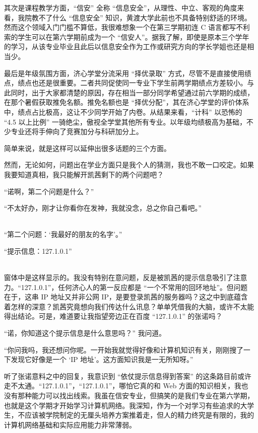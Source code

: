 \documentclass[UTF8]{ctexart}
\begin{document}
其次是课程教学方面，“信安” 全称 “信息安全”，从理性、中立、客观的角度来看，我院教不了什么 “信息安全” 知识，黄渡大学此前也不具备特别舒适的环境。然而这个领域入门门槛不算低，我很难想象一个在第三学期初连 C 语言都写不利索的学生可以在第六学期前成为一个 “信安人”。据我了解，即使是原本三个学年的学习，从该专业毕业且此后以信息安全作为工作或研究方向的学长学姐也还是相当少。

最后是年级氛围方面，济心学堂分流采用 “择优录取” 方式，尽管不是直接使用绩点，绩点也还是很重要。二者共同促使同一专业下学生前两学期绩点方差较小。与此同时，出于大家都清楚的原因，存在相当一部分同学希望通过前六学期的成绩，在那个暑假获取推免名额。推免名额也是 “择优分配”，其在济心学堂的评价体系中，绩点占比极高，这让不少同学开始了内卷。从结果来看，“计科” 以恐怖的 “4.5 以上比例” 一骑绝尘，傲视全学堂其他所有专业。以年级均绩极高为基础，不少专业还将手伸向了竞赛加分与科研加分上。

简单来说，就是这样可以延伸出很多话题的三个方面。

然而，无论如何，问题出在学业方面只是我个人的猜测，我也不敢一口咬定。如果我要知道真相，我只能解开凯茜剩下的两个问题吧？

“诺啊，第二个问题是什么？”

“不太好办，刚才让你看你在发神，我就没念，总之你自己看吧。”

~\\

“第二个问题：‘我最好的朋友的名字’。”

“提示信息：127.1.0.1”

~\\

窗体中是这样显示的。我没有特别在意问题，反是被凯茜的提示信息吸引了注意力。“127.1.0.1”，任何济心人的第一反应都是 “一个不常用的回环地址”。但问题在于，这串 IP 地址又并非公网 IP，是要登录凯茜的服务器吗？这之中到底蕴含着怎样的深意？凯茜究竟想向我们传达什么讯息？单单凭借我的大脑，或许不太能得出结论。可是，难道要让我指望旁边正在百度 “127.1.0.1” 的张诺吗？

“诺，你知道这个提示信息是什么意思吗？” 我问道。

“你问我吗，我还想问你呢。一开始我就觉得好像和计算机知识有关，刚刚搜了一下发现它好像是一个 ‘IP 地址’。这方面知识我是一无所知呀。”

听了张诺意料之中的回复，我意识到 “依仗提示信息得到答案” 的这条路目前或许走不太通。“127.1.0.1”，“127.1.0.1”，哪怕它真的和 Web 方面的知识相关，我也没有那种能力可以找出线索。我虽在信安专业，但搞笑的是我们专业在第六学期，也就是这个学期才开始学习计算机网络。我深知，作为一个对学习有些追求的大学生，不应该被学院制定的无厘头培养方案推着走，但人的精力终究是有限的，我的计算机网络基础和实际应用能力非常薄弱。
\end{document}
